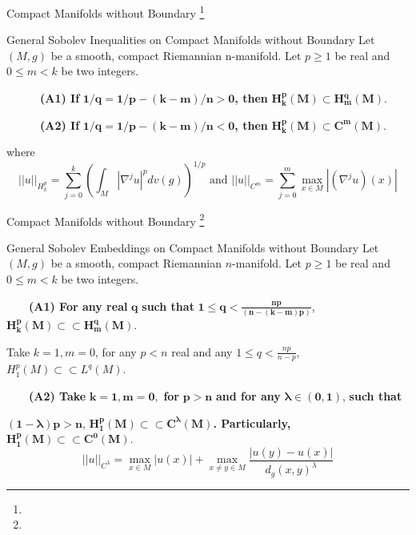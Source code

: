 \documentclass[xcolor=table,dvipsnames,svgnames,aspectratio=169,fontset=windows]{ctexbeamer}
\begin{document}
\begin{frame}{Compact Manifolds without Boundary \footnote{} }
  \begin{alertblock}{General Sobolev Inequalities on Compact Manifolds without Boundary}
    Let $(M, g)$ be a smooth, compact Riemannian n-manifold.
    Let $p\geq 1$ be real and $0 \leq m<k$ be two integers.
    
    \vskip 5pt
    ~~~~~~\textbf{(A1) If} $\bm{1/q=1 / p-(k-m) / n > 0}$\textbf{, then} $\bm{H_k^p(M) \subset H_m^q(M)}$.
    
    \vskip 5pt
    ~~~~~~\textbf{(A2) If} $\bm{1/q=1 / p-(k-m) / n < 0}$\textbf{, then} $\bm{H_k^p(M) \subset C^m(M)}$.
    
    \vskip 5pt
    where
    $$
    ||u||_{H_k^p}=\sum_{j=0}^k\left(\int_M\left|\nabla^j u\right|^p d v(g)\right)^{1 / p}\,\,\text{and}\,\, ||u||_{C^m}=\sum_{j=0}^m \max _{x \in M}\left|\left(\nabla^j u\right)(x)\right|
    $$
  \end{alertblock}
\end{frame}

\begin{frame}{Compact Manifolds without Boundary \footnote{} }
  \begin{alertblock}{General Sobolev Embeddings on Compact Manifolds without Boundary}
    Let $(M, g)$ be a smooth, compact Riemannian $n$-manifold.
    Let $p\geq 1$ be real and $0 \leq m<k$ be two integers.
    
    \vskip 5pt
    ~~~~\textbf{(A1)  For any real} $\bm{q}$ \textbf{such that} $\bm{1 \leq q<\frac{n p}{(n-(k-m) p)}}$,\, $\bm{H_{k}^p(M)\subset \subset H_m^q(M)}$.
    
    \vskip 5pt
    Take $k=1,m=0$, for any $p<n$ real and any $1\leq q <\frac{np}{n-p}$, $H_1^p(M) \subset \subset L^q(M)$.
    
    \vskip 5pt
    ~~~~\textbf{(A2) Take} $\bm{k=1,m=0,}$ \textbf{for} $\bm{p>n}$ \textbf{and for any} $\bm{\lambda \in (0,1)}$, \textbf{such that} 
    
    \vskip 5pt
    $\bm{(1-\lambda) p>n}$, $\bm{H_1^p(M)\subset \subset C^\lambda(M)}$\textbf{. Particularly,} $\bm{H_1^p(M)\subset \subset C^0(M)}$.
    $$
    ||u||_{C^\lambda}=\max _{x \in M}|u(x)|+\max _{x \neq y \in M} \frac{|u(y)-u(x)|}{d_g(x, y)^\lambda}
    $$
  \end{alertblock}
\end{frame}
\end{document}

